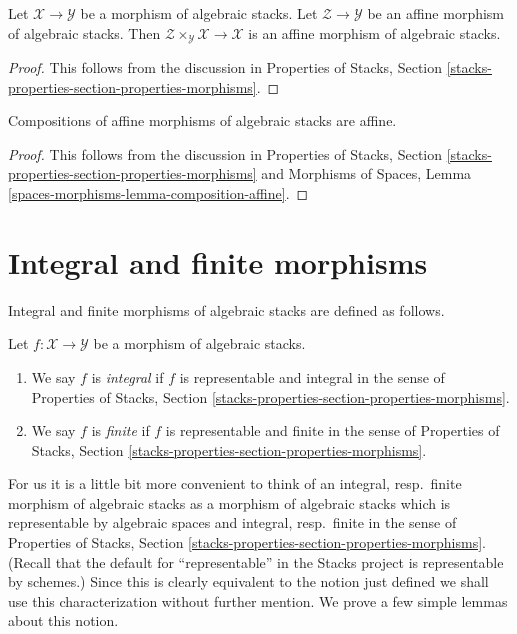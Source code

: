 \begin{lemma}
\label{lemma-base-change-affine}
Let $\mathcal{X} \to \mathcal{Y}$ be a morphism of algebraic stacks.
Let $\mathcal{Z} \to \mathcal{Y}$ be an affine morphism of algebraic
stacks. Then $\mathcal{Z} \times_\mathcal{Y} \mathcal{X} \to \mathcal{X}$
is an affine morphism of algebraic stacks.
\end{lemma}

\begin{proof}
This follows from the discussion in
Properties of Stacks, Section
\ref{stacks-properties-section-properties-morphisms}.
\end{proof}

\begin{lemma}
\label{lemma-composition-affine}
Compositions of affine morphisms of algebraic stacks are affine.
\end{lemma}

\begin{proof}
This follows from the discussion in
Properties of Stacks, Section
\ref{stacks-properties-section-properties-morphisms}
and
Morphisms of Spaces, Lemma \ref{spaces-morphisms-lemma-composition-affine}.
\end{proof}





\section{Integral and finite morphisms}
\label{section-integral}

\noindent
Integral and finite morphisms of algebraic stacks are defined as follows.

\begin{definition}
\label{definition-integral}
Let $f : \mathcal{X} \to \mathcal{Y}$ be a morphism of algebraic stacks.
\begin{enumerate}
\item We say $f$ is {\it integral} if $f$ is representable and integral
in the sense of Properties of Stacks, Section
\ref{stacks-properties-section-properties-morphisms}.
\item We say $f$ is {\it finite} if $f$ is representable and finite
in the sense of Properties of Stacks, Section
\ref{stacks-properties-section-properties-morphisms}.
\end{enumerate}
\end{definition}

\noindent
For us it is a little bit more convenient to think of an
integral, resp.\ finite morphism of algebraic stacks as a
morphism of algebraic stacks which is
representable by algebraic spaces and integral, resp.\ finite
in the sense of Properties of Stacks, Section
\ref{stacks-properties-section-properties-morphisms}.
(Recall that the default for ``representable'' in the Stacks project
is representable by schemes.)
Since this is clearly equivalent to the notion just defined we shall
use this characterization without further mention.
We prove a few simple lemmas about this notion.

